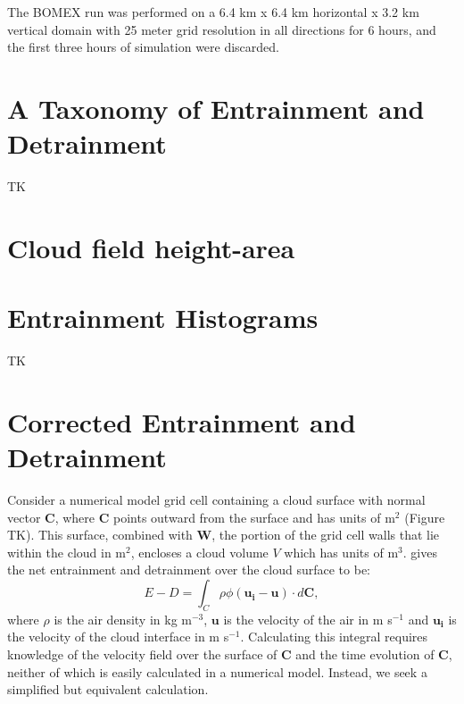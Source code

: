 \documentclass[acp]{copernicus}
\begin{document}
The BOMEX run was performed on a 6.4 km x 6.4 km horizontal x 3.2 km vertical 
domain with 25 meter grid resolution in all directions for 6 hours, and the 
first three hours of simulation were discarded. 


\section{A Taxonomy of Entrainment and Detrainment}

TK


\section{Cloud field height-area}



\section{Entrainment Histograms}

TK


\section{Corrected Entrainment and Detrainment}

Consider a numerical model grid cell containing a cloud surface with normal 
vector $\mathbf{C}$, where $\mathbf{C}$ points outward from the surface and 
has units of m$^2$ (Figure TK).  This surface, 
combined with $\mathbf{W}$, the portion of the grid cell walls that lie within 
the cloud in m$^2$, encloses a cloud volume $V$ which has units of m$^3$.  
\cite{Siebesma1998} gives the net entrainment and detrainment over the cloud 
surface to be:
\begin{equation}
\label{eq:E_minus_D} 
E - D = \int_C \rho \phi ( \mathbf{u_i} -  \mathbf{u}) \cdot d\mathbf{C},
\end{equation}
where $\rho$ is the air density in kg m$^{-3}$, $\mathbf{u}$ is the velocity
of the air in m s$^{-1}$ and $\mathbf{u_i}$ is the velocity of the cloud 
interface in m s$^{-1}$.  Calculating this integral requires knowledge of the 
velocity field over the surface of $\mathbf{C}$ and the time evolution of 
$\mathbf{C}$, neither of which is easily calculated in a numerical model.  
Instead, we seek a simplified but equivalent calculation.
\end{document}
